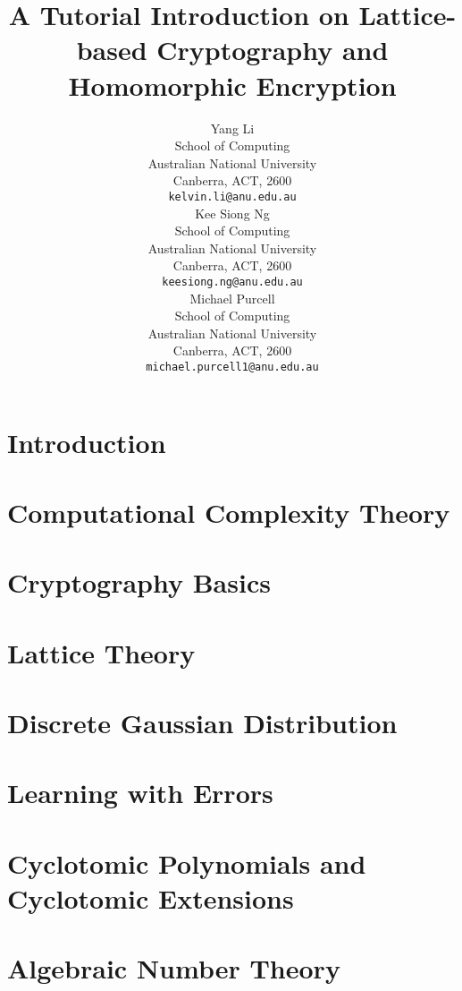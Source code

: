 \documentclass[letterpaper]{article}
\title{A Tutorial Introduction on Lattice-based Cryptography and Homomorphic Encryption}
\author{
  Yang Li \\
  School of Computing\\
  Australian National University\\
  Canberra, ACT, 2600 \\
  \texttt{kelvin.li@anu.edu.au} \\
   \And
 Kee Siong Ng \\
  School of Computing\\
  Australian National University\\
  Canberra, ACT, 2600 \\
  \texttt{keesiong.ng@anu.edu.au} \\
  \And
  Michael Purcell \\
  School of Computing \\
  Australian National University \\
  Canberra, ACT, 2600 \\
  \texttt{michael.purcell1@anu.edu.au}\\
}
\begin{document}
\maketitle

\tableofcontents

%

\newpage
\section{Introduction}


\newpage
\section{Computational Complexity Theory}\label{sec:computational complexity}


\newpage
\section{Cryptography Basics}



\newpage
\section{Lattice Theory}


\newpage
\section{Discrete Gaussian Distribution}\label{sec:discrete gaussian}


\newpage
\section{Learning with Errors}


\newpage
\section{Cyclotomic Polynomials and Cyclotomic Extensions}


\newpage
\section{Algebraic Number Theory}\label{sec:ant short}

\end{document}
